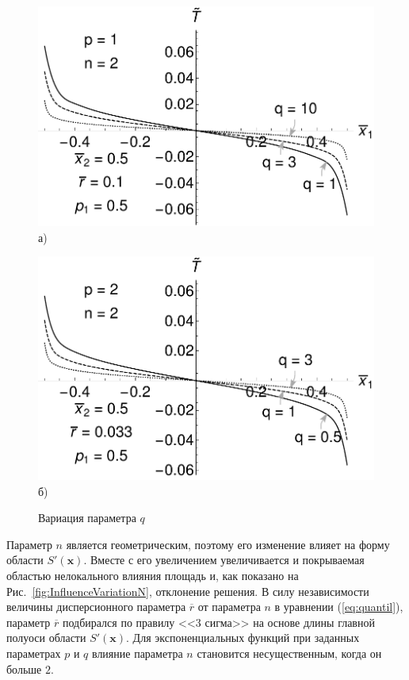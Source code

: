 \begin{figure}[ht]
    \begin{minipage}[b][][b]{0.49\linewidth}\centering
        \includegraphics[width=\linewidth]{pics/TPolyInfluenceVariationQ.pdf} \\ а)
    \end{minipage}
    \hfill
    \begin{minipage}[b][][b]{0.49\linewidth}\centering
        \includegraphics[width=\linewidth]{pics/TExpInfluenceVariationQ.pdf} \\ б)
    \end{minipage}
    \caption{Вариация параметра $q$}
    \label{fig:InfluenceVariationQ}
\end{figure}

Параметр $n$ является геометрическим, поэтому его изменение влияет на форму области $S'(\boldsymbol{x})$. Вместе с его увеличением увеличивается и покрываемая областью нелокального влияния площадь и, как показано на Рис.~\ref{fig:InfluenceVariationN}, отклонение решения. В силу независимости величины дисперсионного параметра $\overline{r}$ от параметра $n$ в уравнении (\ref{eq:quantil}), параметр $\overline{r}$ подбирался по правилу <<3 сигма>> на основе длины главной полуоси области $S'(\boldsymbol{x})$. Для экспоненциальных функций при заданных параметрах $p$ и $q$ влияние параметра $n$ становится несущественным, когда он больше $2$.

